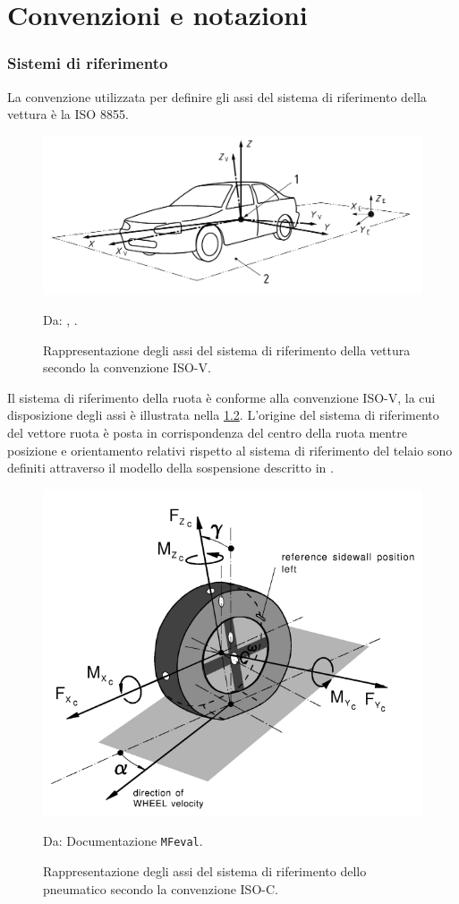 \chapter{Convenzioni e notazioni}
\label{Notazioni}
%
\subsection{Sistemi di riferimento}
La convenzione utilizzata per definire gli assi del sistema di riferimento della vettura è la \ac{ISO} 8855.

\begin{figure}[h!]
	\centering
	\includegraphics[width=0.8\linewidth]{Figures/iso_convention}
	\caption{Rappresentazione degli assi del sistema di riferimento della vettura secondo la convenzione ISO-V.}
	Da: \citeauthor{Ginebra}, .
	\label{isoconventionv}
\end{figure}

\noindent
Il sistema di riferimento della ruota è conforme alla convenzione \ac{ISO}-V, la cui disposizione degli assi è illustrata nella \figurename{ \ref{isoconventionc}}. L'origine del sistema di riferimento del vettore ruota è posta in corrispondenza del centro della ruota mentre posizione e orientamento relativi rispetto al sistema di riferimento del telaio sono definiti attraverso il modello della sospensione descritto in \cite{Larcher}.

\begin{figure}[h!]
	\centering
	\includegraphics[width=0.7\linewidth]{Figures/iso_convention_wheel}
	\caption{Rappresentazione degli assi  del sistema di riferimento dello pneumatico secondo la convenzione ISO-C.}
	Da: Documentazione \texttt{MFeval}.
	\label{isoconventionc}
\end{figure}
%
